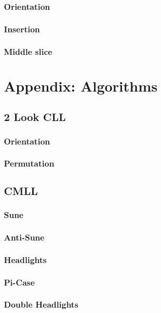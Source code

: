 \documentclass[a4paper]{scrreprt}
\begin{document}
\subsection{Orientation}
\subsection{Insertion}
\subsection{Middle slice}



\chapter{Appendix: Algorithms}

\section{2 Look CLL}
\subsection{Orientation}
\subsection{Permutation}

\section{CMLL}
\subsection{Sune}
\subsection{Anti-Sune}
\subsection{Headlights}
\subsection{Pi-Case}
\subsection{Double Headlights}
\end{document}
